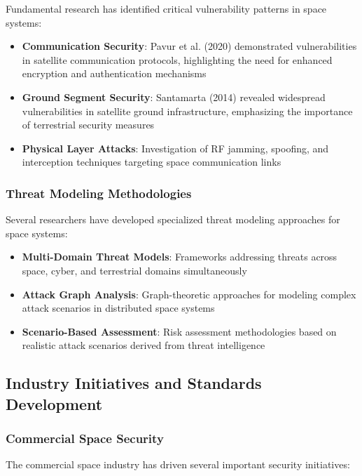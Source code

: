 \documentclass[binding=0.6cm]{sapthesis}
\begin{document}
Fundamental research has identified critical vulnerability patterns in space systems:

\begin{itemize}
    \item \textbf{Communication Security}: Pavur et al. (2020) demonstrated vulnerabilities in satellite communication protocols, highlighting the need for enhanced encryption and authentication mechanisms
    \item \textbf{Ground Segment Security}: Santamarta (2014) revealed widespread vulnerabilities in satellite ground infrastructure, emphasizing the importance of terrestrial security measures
    \item \textbf{Physical Layer Attacks}: Investigation of RF jamming, spoofing, and interception techniques targeting space communication links
\end{itemize}

\subsubsection{Threat Modeling Methodologies}

Several researchers have developed specialized threat modeling approaches for space systems:

\begin{itemize}
    \item \textbf{Multi-Domain Threat Models}: Frameworks addressing threats across space, cyber, and terrestrial domains simultaneously
    \item \textbf{Attack Graph Analysis}: Graph-theoretic approaches for modeling complex attack scenarios in distributed space systems
    \item \textbf{Scenario-Based Assessment}: Risk assessment methodologies based on realistic attack scenarios derived from threat intelligence
\end{itemize}

\subsection{Industry Initiatives and Standards Development}

\subsubsection{Commercial Space Security}

The commercial space industry has driven several important security initiatives:
\end{document}
